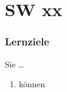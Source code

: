 \part{SW xx}
\section{Lernziele}
Sie \dots
\begin{enumerate}
    \item können
\end{enumerate}

\section{}
\subsection{}